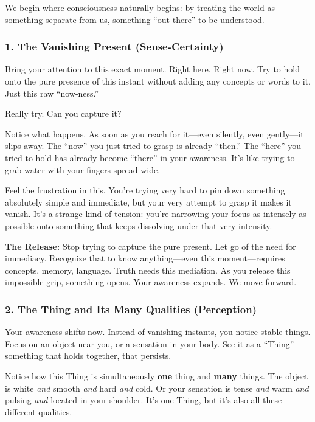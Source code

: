 We begin where consciousness naturally begins: by treating the world as something separate from us, something ``out there'' to be understood.

\subsubsection{1. The Vanishing Present (Sense-Certainty)}\label{the-vanishing-present-sense-certainty}

Bring your attention to this exact moment. Right here. Right now. Try to hold onto the pure presence of this instant without adding any concepts or words to it. Just this raw ``now-ness.''

Really try. Can you capture it?

Notice what happens. As soon as you reach for it---even silently, even gently---it slips away. The ``now'' you just tried to grasp is already ``then.'' The ``here'' you tried to hold has already become ``there'' in your awareness. It's like trying to grab water with your fingers spread wide.

Feel the frustration in this. You're trying very hard to pin down something absolutely simple and immediate, but your very attempt to grasp it makes it vanish. It's a strange kind of tension: you're narrowing your focus as intensely as possible onto something that keeps dissolving under that very intensity.

\textbf{The Release:} Stop trying to capture the pure present. Let go of the need for immediacy. Recognize that to know anything---even this moment---requires concepts, memory, language. Truth needs this mediation. As you release this impossible grip, something opens. Your awareness expands. We move forward.

\subsubsection{2. The Thing and Its Many Qualities (Perception)}\label{the-thing-and-its-many-qualities-perception}

Your awareness shifts now. Instead of vanishing instants, you notice stable things. Focus on an object near you, or a sensation in your body. See it as a ``Thing''---something that holds together, that persists.

Notice how this Thing is simultaneously \textbf{one} thing and \textbf{many} things. The object is white \emph{and} smooth \emph{and} hard \emph{and} cold. Or your sensation is tense \emph{and} warm \emph{and} pulsing \emph{and} located in your shoulder. It's one Thing, but it's also all these different qualities.

